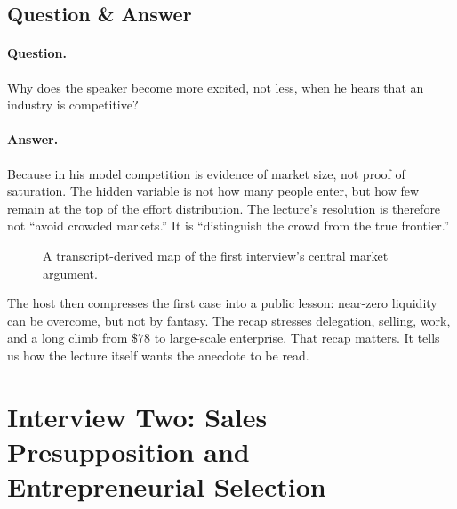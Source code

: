 \subsection{Question \& Answer}

\paragraph{Question.} Why does the speaker become more excited, not less, when he hears that an industry is competitive?

\paragraph{Answer.} Because in his model competition is evidence of market size, not proof of saturation. The hidden variable is not how many people enter, but how few remain at the top of the effort distribution. The lecture's resolution is therefore not ``avoid crowded markets.'' It is ``distinguish the crowd from the true frontier.''

\begin{figure}
\centering
{}
\caption{A transcript-derived map of the first interview's central market argument.}
\end{figure}

The host then compresses the first case into a public lesson: near-zero liquidity can be overcome, but not by fantasy. The recap stresses delegation, selling, work, and a long climb from \(\text{\$}78\) to large-scale enterprise. That recap matters. It tells us how the lecture itself wants the anecdote to be read.

\section{Interview Two: Sales Presupposition and Entrepreneurial Selection}

